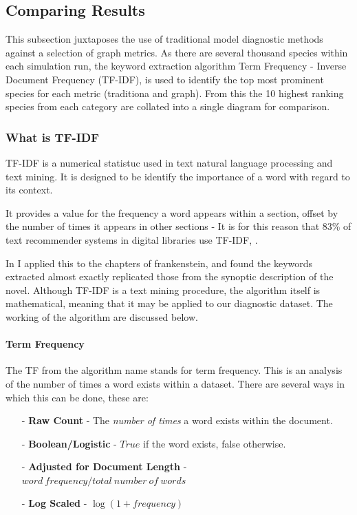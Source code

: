 \subsection{Comparing Results}
This subsection juxtaposes the use of traditional model diagnostic methods against a selection of graph metrics. As there are several thousand species within each simulation run, the keyword extraction algorithm Term Frequency - Inverse Document Frequency (TF-IDF), is used to identify the top most prominent species for each metric (traditiona and graph). From this the 10 highest ranking species from each category are collated into a single diagram for comparison. 


\subsubsection{What is TF-IDF}
TF-IDF is a numerical statistuc used in text natural language processing and text mining. It is designed to be identify the importance of a word with regard to its context. 

It provides a value for the frequency a word appears within a section, offset by the number of times it appears in other sections - It is for this reason that 83\% of text recommender systems in digital libraries use TF-IDF, \citep{tf83}. 

 In \citep{frankenstein} I applied this to the chapters of frankenstein, and found the keywords extracted almost exactly replicated those from the synoptic description of the novel. Although TF-IDF is a text mining procedure, the algorithm itself is mathematical, meaning that it may be applied to our diagnostic dataset. The working of the algorithm are discussed below.

\paragraph*{Term Frequency}
The TF from the algorithm name stands for term frequency. This is an analysis of the number of times a word exists within a dataset. There are several ways in which this can be done, these are:

\begin{itemize}
    \item[-] \textbf{Raw Count} - The \textit{number of times} a word exists within the document.
    \item[-] \textbf{Boolean/Logistic} - $True$ if the word exists, false otherwise.
    \item[-] \textbf{Adjusted for Document Length} -  $word\ frequency / total\ number\ of\ words$
    \item[-] \textbf{Log Scaled} - $\log(1+frequency)$
\end{itemize}

